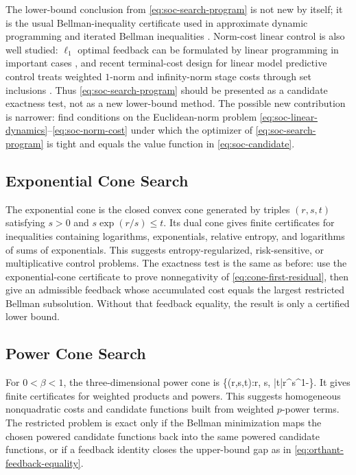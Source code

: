 \documentclass{article}
\begin{document}
The lower-bound conclusion from \eqref{eq:soc-search-program} is not new by itself; it is the usual Bellman-inequality certificate used in approximate dynamic programming and iterated Bellman inequalities \cite{de-farias-van-roy-2003,wang-odonoghue-boyd-2015}. Norm-cost linear control is also well studied: $\ell_1$ optimal feedback can be formulated by linear programming in important cases \cite{dahleh-pearson-1987}, and recent terminal-cost design for linear model predictive control treats weighted $1$-norm and infinity-norm stage costs through set inclusions \cite{danielson-2021}. Thus \eqref{eq:soc-search-program} should be presented as a candidate exactness test, not as a new lower-bound method. The possible new contribution is narrower: find conditions on the Euclidean-norm problem \eqref{eq:soc-linear-dynamics}--\eqref{eq:soc-norm-cost} under which the optimizer of \eqref{eq:soc-search-program} is tight and equals the value function in \eqref{eq:soc-candidate}.

\subsection{Exponential Cone Search}

The exponential cone is the closed convex cone generated by triples $(r,s,t)$ satisfying $s>0$ and $s\exp(r/s)\leq t$. Its dual cone gives finite certificates for inequalities containing logarithms, exponentials, relative entropy, and logarithms of sums of exponentials. This suggests entropy-regularized, risk-sensitive, or multiplicative control problems. The exactness test is the same as before: use the exponential-cone certificate to prove nonnegativity of \eqref{eq:cone-first-residual}, then give an admissible feedback whose accumulated cost equals the largest restricted Bellman subsolution. Without that feedback equality, the result is only a certified lower bound.

\subsection{Power Cone Search}

For $0<\beta<1$, the three-dimensional power cone is
\BEQ
\{(r,s,t):r,
s,
|t|\leq r^\beta s^{1-\beta}\}.
\label{eq:power-cone}
\EEQ
It gives finite certificates for weighted products and powers. This suggests homogeneous nonquadratic costs and candidate functions built from weighted $p$-power terms. The restricted problem is exact only if the Bellman minimization maps the chosen powered candidate functions back into the same powered candidate functions, or if a feedback identity closes the upper-bound gap as in \eqref{eq:orthant-feedback-equality}.
\end{document}
